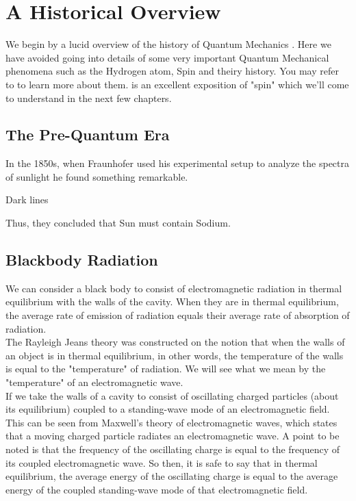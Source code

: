 \chapter{A Historical Overview}
We begin by a lucid overview of the history of Quantum Mechanics . Here we have avoided going into details of some very important Quantum Mechanical phenomena such as the Hydrogen atom, Spin and theiry history. You may refer to \cite{p34} to learn more about them. \cite{} is an excellent exposition of "spin" which we'll come to understand in the next few chapters.
\section{The Pre-Quantum Era}
In the 1850s, when Fraunhofer used his experimental setup to analyze the spectra of sunlight he found something remarkable.

Dark lines 

Thus, they concluded that Sun must contain Sodium.
\section{Blackbody Radiation}
We can consider a black body to consist of electromagnetic radiation in thermal equilibrium with the walls of the cavity. When they are in thermal equilibrium, the average rate of emission of radiation equals their average rate of absorption of radiation. \\

\noindent The Rayleigh Jeans theory was constructed on the notion that when the walls of an object is in thermal equilibrium, in other words, the temperature of the walls is equal to the "temperature" of radiation. We will see what we mean by the "temperature" of an electromagnetic wave. \\

\noindent If we take the walls of a cavity to consist of oscillating charged particles (about its equilibrium) coupled to a standing-wave mode of an electromagnetic field. This can be seen from Maxwell's theory of electromagnetic waves, which states that a moving charged particle radiates an electromagnetic wave. A point to be noted is that the frequency of the oscillating charge is equal to the frequency of its coupled electromagnetic wave. So then, it is safe to say that in thermal equilibrium, the average energy of the oscillating charge is equal to the average energy of the coupled standing-wave mode of that electromagnetic field. \\

